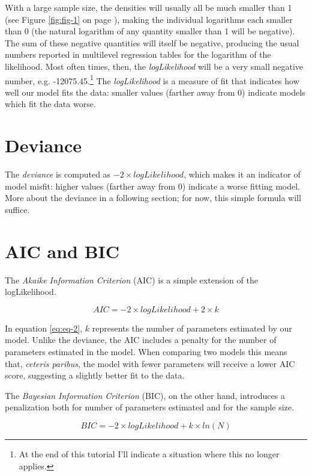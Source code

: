 \documentclass[12pt,english]{article}\usepackage[]{graphicx}\usepackage[usenames, dvipsnames]{xcolor}
\begin{document}
With a large sample size, the densities will usually all be much smaller than 1 (see Figure \ref{fig:fig-1} on page \pageref{fig:fig-1}), making the individual logarithms each smaller than 0 (the natural logarithm of any quantity smaller than 1 will be negative). The sum of these negative quantities will itself be negative, producing the usual numbers reported in multilevel regression tables for the logarithm of the likelihood. Most often times, then, the \textit{logLikelihood} will be a very small negative number, e.g. -12075.45.\footnote{At the end of this tutorial I'll indicate a situation where this no longer applies.} The \textit{logLikelihood} is a measure of fit that indicates how well our model fits the data: smaller values (farther away from 0) indicate models which fit the data worse.



\section{Deviance}
The \textit{deviance} is computed as $-2 \times logLikelihood$, which makes it an indicator of model misfit: higher values (farther away from 0) indicate a worse fitting model. More about the deviance in a following section; for now, this simple formula will suffice.


\section{AIC and BIC}
The \textit{Akaike Information Criterion} (AIC) is a simple extension of the logLikelihood.

\begin{equation}
\label{eq:eq-2}
AIC=-2 \times logLikelihood + 2 \times k
\end{equation}

In equation \ref{eq:eq-2}, $k$ represents the number of parameters estimated by our model. Unlike the deviance, the AIC includes a penalty for the number of parameters estimated in the model. When comparing two models this means that, \textit{ceteris paribus}, the model with fewer parameters will receive a lower AIC score, suggesting a slightly better fit to the data.

The \textit{Bayesian Information Criterion} (BIC), on the other hand, introduces a penalization both for number of parameters estimated and for the sample size.

\begin{equation}
\label{eq:eq-3}
BIC=-2 \times logLikelihood + k \times ln(N)
\end{equation}
\end{document}
